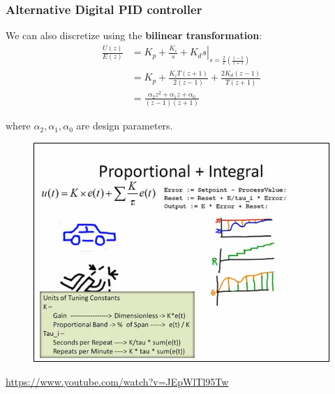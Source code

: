 \begin{frame}
	\frametitle{Alternative Digital PID controller}
	We can also discretize using the \textbf{bilinear transformation}:
	\begin{align*}
		\frac{U(z)}{E(z)} &=  
				\left. K_p + \frac{K_i}{s} + K_d s \right|_
							{s=\frac{2}{T}\left( \frac{z-1}{z+1}\right)}  \\
			&= K_p + \frac{K_iT(z + 1)}{2(z-1)} + \frac{2K_d(z-1)}{T(z+1)} \\
			&= \frac{\alpha_2 z^2 + \alpha_1 z + \alpha_0}{(z-1)(z+1)}
	\end{align*}
	
	where $\alpha_2, \alpha_1, \alpha_0$ are design parameters.
	
\end{frame}
\begin{frame}
	\begin{figure}
\centering
\includegraphics[width=0.7\linewidth]{img/PID_video}

\end{figure}

	\url{https://www.youtube.com/watch?v=JEpWlTl95Tw}
\end{frame}
